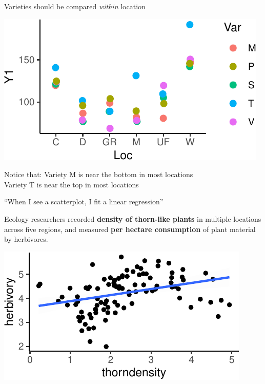 \documentclass[
  12pt,
  ignorenonframetext,
  aspectratio=169,
]{beamer}
\begin{document}
\begin{frame}{Varieties should be compared \emph{within} location}
\protect\hypertarget{varieties-should-be-compared-within-location}{}

\begin{center}\includegraphics{Lecture-1_files/figure-beamer/unnamed-chunk-9-1} \end{center}

Notice that: Variety M is near the bottom in most locations\\
Variety T is near the top in most locations

\end{frame}

\begin{frame}{``When I see a scatterplot, I fit a linear regression''}
\protect\hypertarget{when-i-see-a-scatterplot-i-fit-a-linear-regression}{}

Ecology researchers recorded \textbf{density of thorn-like plants} in
multiple locations across five regions, and measured \textbf{per hectare
consumption} of plant material by herbivores.

\begin{center}\includegraphics{Lecture-1_files/figure-beamer/unnamed-chunk-10-1} \end{center}

\end{frame}
\end{document}
